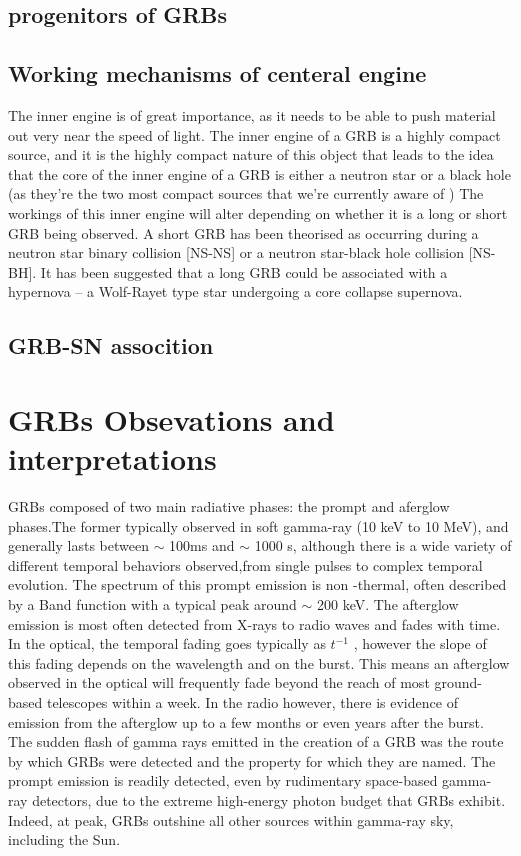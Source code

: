 \subsection{ progenitors of GRBs}
\subsection{Working mechanisms of centeral engine}
The inner engine is of great importance, as it needs to be able to push material out very near the speed of light. The inner engine of a GRB is a highly compact source, and it is the highly compact nature of this object that leads to the idea that the core of the inner engine of a GRB is either a neutron star or a black hole (as they're the two most compact sources that we're currently aware of )
The workings of this inner engine will alter depending on whether it is a long or short GRB being observed. A short GRB has been theorised as occurring during a neutron star binary collision [NS-NS] or a neutron star-black hole collision [NS-BH]. It has been suggested that a long GRB could be associated with a hypernova -- a Wolf-Rayet type star undergoing a core collapse supernova.\citep{21}
\subsection{GRB-SN assocition}
\section{GRBs Obsevations and interpretations }
GRBs composed of two main radiative phases: the prompt and aferglow phases.The
former typically observed in soft gamma-ray (10 keV to 10 MeV), and generally
lasts between $ \sim $ 100ms and $ \sim $ 1000 s, although there is a wide variety of different temporal behaviors observed,from single pulses to complex temporal evolution. The spectrum of this prompt emission is non -thermal, often described by a Band function with a typical peak around $ \sim $ 200 keV.
The afterglow emission is most often detected from X-rays to radio waves and fades
with time. In the optical, the temporal fading goes typically as $ t^{-1} $ , however the slope of this fading depends on the wavelength and on the burst. This means an
afterglow observed in the optical will frequently fade beyond the reach of most
ground-based telescopes within a week. In the radio however, there is evidence of
emission from the afterglow up to a few months or even years after the burst.
The sudden flash of gamma rays emitted in the creation of a GRB was the route
by which GRBs were detected and the property for which they are named. The
prompt emission is readily detected, even by rudimentary space-based gamma-
ray detectors, due to the extreme high-energy photon budget that GRBs exhibit.
Indeed, at peak, GRBs outshine all other sources within gamma-ray sky, including
the Sun.\citep{18}\\\\
